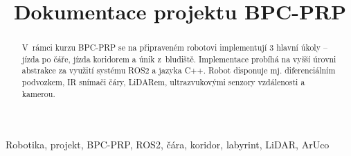 \documentclass[conference]{IEEEtran}
\begin{document}
\title{Dokumentace projektu BPC-PRP}

\author{
\and
{}
}

\maketitle

\begin{abstract}
V~rámci kurzu BPC-PRP se na připraveném robotovi implementují 3 hlavní úkoly – jízda po čáře, jízda koridorem a únik z~bludiště. Implementace probíhá na vyšší úrovni abstrakce za využití systému ROS2 a jazyka C++. Robot disponuje mj. diferenciálním podvozkem, IR snímači čáry, LiDARem, ultrazvukovými senzory vzdálenosti a kamerou.
\end{abstract}

\renewcommand\IEEEkeywordsname{Klíčová slova}
\begin{IEEEkeywords}
Robotika, projekt, BPC-PRP, ROS2, čára, koridor, labyrint, LiDAR, ArUco
\end{IEEEkeywords}







\printbibliography
\end{document}
